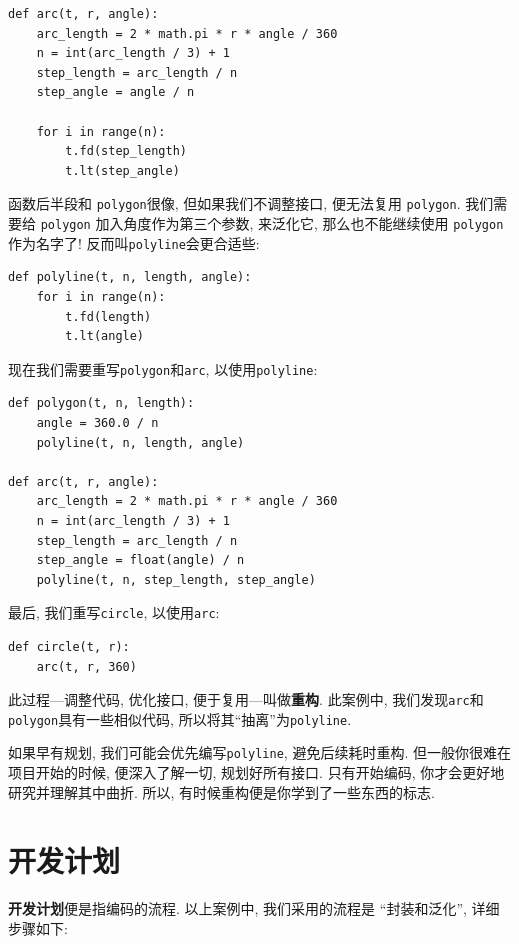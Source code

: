 \documentclass[10pt]{book}
\begin{document}
\begin{verbatim}
def arc(t, r, angle):
    arc_length = 2 * math.pi * r * angle / 360
    n = int(arc_length / 3) + 1
    step_length = arc_length / n
    step_angle = angle / n
    
    for i in range(n):
        t.fd(step_length)
        t.lt(step_angle)
\end{verbatim}
%
函数后半段和 {\tt polygon}很像, 但如果我们不调整接口, 便无法复用 {\tt polygon}. 
我们需要给 {\tt polygon} 加入角度作为第三个参数, 来泛化它, 
那么也不能继续使用 {\tt polygon}作为名字了!
反而叫{\tt polyline}会更合适些:

\begin{verbatim}
def polyline(t, n, length, angle):
    for i in range(n):
        t.fd(length)
        t.lt(angle)
\end{verbatim}
%
现在我们需要重写{\tt polygon}和{\tt arc}, 以使用{\tt polyline}:

\begin{verbatim}
def polygon(t, n, length):
    angle = 360.0 / n
    polyline(t, n, length, angle)

def arc(t, r, angle):
    arc_length = 2 * math.pi * r * angle / 360
    n = int(arc_length / 3) + 1
    step_length = arc_length / n
    step_angle = float(angle) / n
    polyline(t, n, step_length, step_angle)
\end{verbatim}
%
最后, 我们重写{\tt circle}, 以使用{\tt arc}:

\begin{verbatim}
def circle(t, r):
    arc(t, r, 360)
\end{verbatim}
%
此过程---调整代码, 优化接口, 便于复用---叫做{\bf 重构}. 
此案例中, 我们发现{\tt arc}和{\tt polygon}具有一些相似代码, 
所以将其``抽离''为{\tt polyline}.\

如果早有规划, 我们可能会优先编写{\tt polyline}, 避免后续耗时重构. 
但一般你很难在项目开始的时候, 便深入了解一切, 规划好所有接口. 
只有开始编码, 你才会更好地研究并理解其中曲折. 
所以, 有时候重构便是你学到了一些东西的标志. 


\section{开发计划}

{\bf 开发计划}便是指编码的流程. 以上案例中, 我们采用的流程是
``封装和泛化'', 详细步骤如下:
\end{document}
